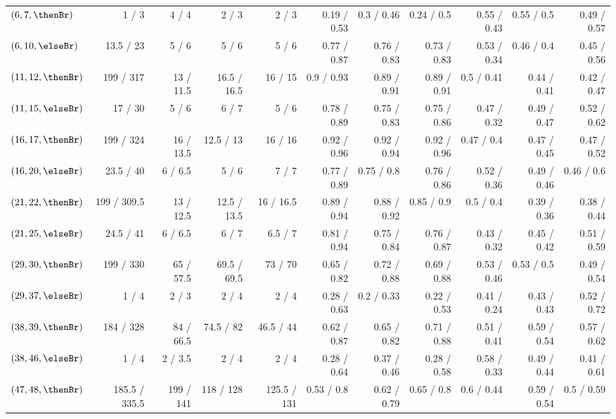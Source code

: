 \begin{table*}
{\begin{tabular}{l|rrrr|r|r|r|r|r|r}
    $(6,7,\thenBr)$   & 1       / 3     & 4    / 4    & 2     / 3     & 2     / 3     & 0.19 / 0.53 & 0.3 / 0.46 & 0.24 / 0.5 & 0.55 / 0.43   & 0.55 / 0.5  & 0.49 / 0.57 \\
    $(6,10,\elseBr)$  & 13.5    / 23    & 5    / 6    & 5     / 6     & 5     / 6     & 0.77 / 0.87 & 0.76 / 0.83 & 0.73 / 0.83 & 0.53 / 0.34 & 0.46 / 0.4  & 0.45 / 0.56 \\
    $(11,12,\thenBr)$ & 199     / 317   & 13   / 11.5 & 16.5  / 16.5  & 16    / 15    & 0.9 / 0.93  & 0.89 / 0.91 & 0.89 / 0.91 & 0.5 / 0.41  & 0.44 / 0.41 & 0.42 / 0.47 \\
    $(11,15,\elseBr)$ & 17      / 30    & 5    / 6    & 6     / 7     & 5     / 6     & 0.78 / 0.89 & 0.75 / 0.83 & 0.75 / 0.86 & 0.47 / 0.32 & 0.49 / 0.47 & 0.52 / 0.62 \\
    $(16,17,\thenBr)$ & 199     / 324   & 16   / 13.5 & 12.5  / 13    & 16    / 16    & 0.92 / 0.96 & 0.92 / 0.94 & 0.92 / 0.96 & 0.47 / 0.4  & 0.47 / 0.45 & 0.47 / 0.52 \\
    $(16,20,\elseBr)$ & 23.5    / 40    & 6    / 6.5  & 5     / 6     & 7     / 7     & 0.77 / 0.89 & 0.75 / 0.8  & 0.76 / 0.86 & 0.52 / 0.36 & 0.49 / 0.46 & 0.46 / 0.6 \\
    $(21,22,\thenBr)$ & 199     / 309.5 & 13   / 12.5 & 12.5  / 13.5  & 16    / 16.5  & 0.89 / 0.94 & 0.88 / 0.92 & 0.85 / 0.9  & 0.5 / 0.4   & 0.39 / 0.36 & 0.38 / 0.44 \\
    $(21,25,\elseBr)$ & 24.5    / 41    & 6    / 6.5  & 6     / 7     & 6.5   / 7     & 0.81 / 0.94 & 0.75 / 0.84 & 0.76 / 0.87 & 0.43 / 0.32 & 0.45 / 0.42 & 0.51 / 0.59 \\
    $(29,30,\thenBr)$ & 199     / 330   & 65   / 57.5 & 69.5  / 69.5  & 73    / 70    & 0.65 / 0.82 & 0.72 / 0.88 & 0.69 / 0.88 & 0.53 / 0.46 & 0.53 / 0.5  & 0.49 / 0.54 \\
    $(29,37,\elseBr)$ & 1       / 4     & 2    / 3    & 2     / 4     & 2     / 4     & 0.28 / 0.63 & 0.2 / 0.33  & 0.22 / 0.53 & 0.41 / 0.24 & 0.43 / 0.43 & 0.52 / 0.72 \\
    $(38,39,\thenBr)$ & 184     / 328   & 84   / 66.5 & 74.5  / 82    & 46.5  / 44    & 0.62 / 0.87 & 0.65 / 0.82 & 0.71 / 0.88 & 0.51 / 0.41 & 0.59 / 0.54 & 0.57 / 0.62 \\
    $(38,46,\elseBr)$ & 1       / 4     & 2    / 3.5  & 2     / 4     & 2     / 4     & 0.28 / 0.64 & 0.37 / 0.46 & 0.28 / 0.58 & 0.58 / 0.33 & 0.49 / 0.44 & 0.41 / 0.61 \\
    $(47,48,\thenBr)$ & 185.5   / 335.5 & 199  / 141  & 118   / 128   & 125.5 / 131   & 0.53 / 0.8  & 0.62 / 0.79 & 0.65 / 0.8  & 0.6 / 0.44  & 0.59 / 0.54 & 0.5 / 0.59 \\

\end{tabular}}
\end{table*}
